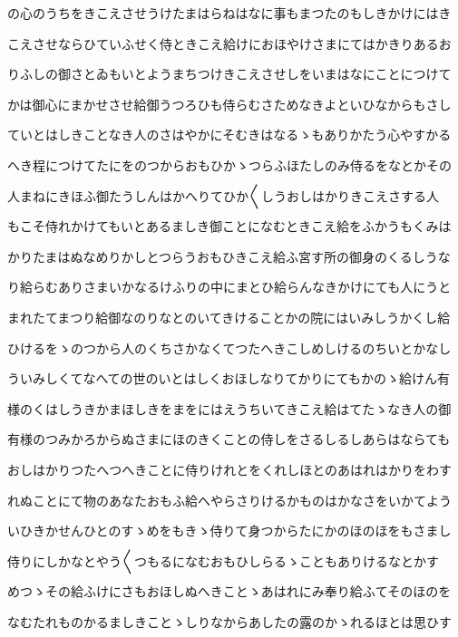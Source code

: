 \documentclass[a4paper,11pt,landscape]{ltjtarticle}
\begin{document}
の心のうちをきこえさせうけたまはらねはなに事もまつたのもしきかけにはき
\par\medskip
こえさせならひていふせく侍ときこえ給けにおほやけさまにてはかきりあるお
\par\medskip
りふしの御さとゐもいとようまちつけきこえさせしをいまはなにことにつけて
\par\medskip
かは御心にまかせさせ給御うつろひも侍らむさためなきよといひなからもさし
\par\medskip
ていとはしきことなき人のさはやかにそむきはなるゝもありかたう心やすかる
\par\medskip
へき程につけてたにをのつからおもひかゝつらふほたしのみ侍るをなとかその
\par\medskip
人まねにきほふ御たうしんはかへりてひか〱しうおしはかりきこえさする人
\par\medskip
もこそ侍れかけてもいとあるましき御ことになむときこえ給をふかうもくみは
\par\medskip
かりたまはぬなめりかしとつらうおもひきこえ給ふ宮す所の御身のくるしうな
\par\medskip
り給らむありさまいかなるけふりの中にまとひ給らんなきかけにても人にうと
\par\medskip
まれたてまつり給御なのりなとのいてきけることかの院にはいみしうかくし給
\par\medskip
ひけるをゝのつから人のくちさかなくてつたへきこしめしけるのちいとかなし
\par\medskip
ういみしくてなへての世のいとはしくおほしなりてかりにてもかのゝ給けん有
\par\medskip
様のくはしうきかまほしきをまをにはえうちいてきこえ給はてたゝなき人の御
\par\medskip
有様のつみかろからぬさまにほのきくことの侍しをさるしるしあらはならても
\par\medskip
おしはかりつたへつへきことに侍りけれとをくれしほとのあはれはかりをわす
\par\medskip
れぬことにて物のあなたおもふ給へやらさりけるかものはかなさをいかてよう
\par\medskip
いひきかせんひとのすゝめをもきゝ侍りて身つからたにかのほのほをもさまし
\par\medskip
侍りにしかなとやう〱つもるになむおもひしらるゝこともありけるなとかす
\par\medskip
めつゝその給ふけにさもおほしぬへきことゝあはれにみ奉り給ふてそのほのを
\par\medskip
なむたれものかるましきことゝしりなからあしたの露のかゝれるほとは思ひす
\par\medskip
\end{document}
